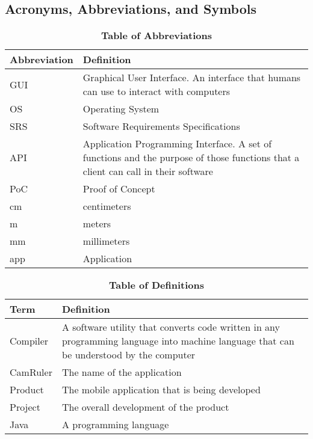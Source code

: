 \documentclass[12pt, titlepage]{article}
\begin{document}
\subsection{Acronyms, Abbreviations, and Symbols}

\begin{table}[H]
\caption{\textbf{Table of Abbreviations}} \label{Table}

\begin{tabularx}{\textwidth}{p{3cm}X}
\toprule
\textbf{Abbreviation} & \textbf{Definition} \\
\midrule
GUI &  Graphical User Interface. An interface that humans can use to interact with computers\\
OS & Operating System\\
SRS & Software Requirements Specifications\\
API & Application Programming Interface. A set of functions and the purpose of those functions that a client can call in their software\\
PoC & Proof of Concept\\
cm & centimeters\\
m & meters\\
mm & millimeters\\
app & Application\\
\bottomrule
\end{tabularx}

\end{table}

\begin{table}[H]
\caption{\textbf{Table of Definitions}} \label{Table}

\begin{tabularx}{\textwidth}{p{3cm}X}
\toprule
\textbf{Term} & \textbf{Definition}\\
\midrule
Compiler & A software utility that converts code written in any programming language into machine language that can be understood by the computer\\
CamRuler &  The name of the application\\
Product & The mobile application that is being developed\\
Project & The overall development of the product\\
Java & A programming language\\
\bottomrule
\end{tabularx}

\end{table}	
\end{document}
